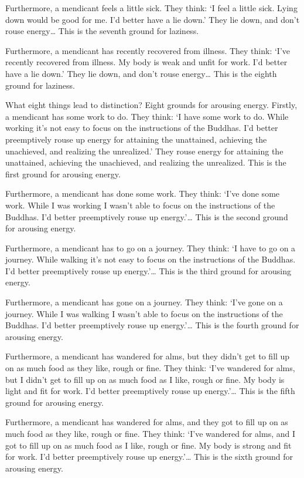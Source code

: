 \documentclass[12pt,openany]{book}%
\begin{document}
Furthermore, a mendicant feels a little sick. They think: ‘I feel a little sick. Lying down would be good for me. I’d better have a lie down.’ They lie down, and don’t rouse energy… This is the seventh ground for laziness. 

Furthermore, a mendicant has recently recovered from illness. They think: ‘I’ve recently recovered from illness. My body is weak and unfit for work. I’d better have a lie down.’ They lie down, and don’t rouse energy… This is the eighth ground for laziness. 

What eight things lead to distinction? Eight grounds for arousing energy. Firstly, a mendicant has some work to do. They think: ‘I have some work to do. While working it’s not easy to focus on the instructions of the Buddhas. I’d better preemptively rouse up energy for attaining the unattained, achieving the unachieved, and realizing the unrealized.’ They rouse energy for attaining the unattained, achieving the unachieved, and realizing the unrealized. This is the first ground for arousing energy. 

Furthermore, a mendicant has done some work. They think: ‘I’ve done some work. While I was working I wasn’t able to focus on the instructions of the Buddhas. I’d better preemptively rouse up energy.’… This is the second ground for arousing energy. 

Furthermore, a mendicant has to go on a journey. They think: ‘I have to go on a journey. While walking it’s not easy to focus on the instructions of the Buddhas. I’d better preemptively rouse up energy.’… This is the third ground for arousing energy. 

Furthermore, a mendicant has gone on a journey. They think: ‘I’ve gone on a journey. While I was walking I wasn’t able to focus on the instructions of the Buddhas. I’d better preemptively rouse up energy.’… This is the fourth ground for arousing energy. 

Furthermore, a mendicant has wandered for alms, but they didn’t get to fill up on as much food as they like, rough or fine. They think: ‘I’ve wandered for alms, but I didn’t get to fill up on as much food as I like, rough or fine. My body is light and fit for work. I’d better preemptively rouse up energy.’… This is the fifth ground for arousing energy. 

Furthermore, a mendicant has wandered for alms, and they got to fill up on as much food as they like, rough or fine. They think: ‘I’ve wandered for alms, and I got to fill up on as much food as I like, rough or fine. My body is strong and fit for work. I’d better preemptively rouse up energy.’… This is the sixth ground for arousing energy. 
\end{document}
